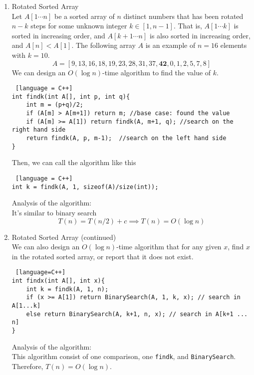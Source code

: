 \documentclass[11pt]{article}
\begin{document}
\begin{enumerate}
\item Rotated Sorted Array\\
Let $A[1 \cdots n]$ be a sorted array of $n$ distinct numbers that has been rotated $n-k$ steps for some unknown integer $k \in [1, n-1]$. That is, $A[1 \cdots k]$ is sorted in increasing order, and $A[k+1 \cdots n]$ is also sorted in increasing order, and $A[n] < A[1]$. The following array $A$ is an example of $n=16$ elements with $k=10$. $$A=[9, 13, 16, 18, 19, 23, 28, 31, 37, \mathbf{42}, 0, 1, 2, 5, 7, 8]$$ We can design an $O(\log n)$-time algorithm to find the value of $k$.
\begin{lstlisting} [language = C++]
int findk(int A[], int p, int q){
	int m = (p+q)/2;
	if (A[m] > A[m+1]) return m; //base case: found the value
	if (A[m] >= A[1]) return findk(A, m+1, q); //search on the right hand side
	return findk(A, p, m-1);  //search on the left hand side
}
\end{lstlisting}
Then, we can call the algorithm like this
\begin{lstlisting} [language = C++]
int k = findk(A, 1, sizeof(A)/size(int));
\end{lstlisting}
Analysis of the algorithm:\\
It's similar to binary search $$T(n) = T(n/2) + c \implies T(n) = O(\log n)$$

\item Rotated Sorted Array (continued)\\
We can also design an $O(\log n)$-time algorithm that for any given $x$, find $x$ in the rotated sorted array, or report that it does not exist.
\begin{lstlisting} [language=C++]
int findx(int A[], int x){
	int k = findk(A, 1, n);
	if (x >= A[1]) return BinarySearch(A, 1, k, x); // search in  A[1...k]
	else return BinarySearch(A, k+1, n, x); // search in A[k+1 ... n]
}
\end{lstlisting}
Analysis of the algorithm:\\
This algorithm consist of one comparison, one \texttt{findk}, and \texttt{BinarySearch}. Therefore, $T(n) = O(\log n)$.


\end{enumerate}
\end{document}
